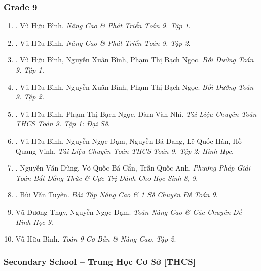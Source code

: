 \documentclass{article}
\begin{document}
\subsubsection{Grade 9}

\begin{enumerate}
	\item \cite{Binh_Toan_9_tap_1}. Vũ Hữu Bình. \textit{Nâng Cao \& Phát Triển Toán 9. Tập 1}.\hfill{\sf[reading]}
	\item \cite{Binh_Toan_9_tap_2}. Vũ Hữu Bình. \textit{Nâng Cao \& Phát Triển Toán 9. Tập 2}.\hfill{\sf[reading]}
	\item \cite{Binh_boi_duong_Toan_9_tap_1}. Vũ Hữu Bình, Nguyễn Xuân Bình, Phạm Thị Bạch Ngọc. \textit{Bồi Dưỡng Toán 9. Tập 1.}\hfill{\sf[finished]}
	\item \cite{Binh_boi_duong_Toan_9_tap_2}. Vũ Hữu Bình, Nguyễn Xuân Bình, Phạm Thị Bạch Ngọc. \textit{Bồi Dưỡng Toán 9. Tập 2.}\hfill{\sf[reading]}
	\item \cite{TLCT_THCS_Toan_9_dai_so}. Vũ Hữu Bình, Phạm Thị Bạch Ngọc, Đàm Văn Nhỉ. \textit{Tài Liệu Chuyên Toán THCS Toán 9. Tập 1: Đại Số}.\hfill{\sf[reading]}
	\item \cite{TLCT_THCS_Toan_9_hinh_hoc}. Vũ Hữu Bình, Nguyễn Ngọc Đạm, Nguyễn Bá Đang, Lê Quốc Hán, Hồ Quang Vinh. \textit{Tài Liệu Chuyên Toán THCS Toán 9. Tập 2: Hình Học}.\hfill{\sf[reading]}
	\item \cite{Dung_Can_Anh_BDT_8_9}. Nguyễn Văn Dũng, Võ Quốc Bá Cẩn, Trần Quốc Anh. \textit{Phương Pháp Giải Toán Bất Đẳng Thức \& Cực Trị Dành Cho Học Sinh 8, 9}.\hfill{\sf[reading]}
	\item \cite{Tuyen_Toan_9_old}. Bùi Văn Tuyên. \textit{Bài Tập Nâng Cao \& 1 Số Chuyên Đề Toán 9}.\hfill{\sf[reading]}
	\item Vũ Dương Thụy, Nguyễn Ngọc Đạm. \textit{Toán Nâng Cao \& Các Chuyên Đề Hình Học 9}.
	\item Vũ Hữu Bình. \textit{Toán 9 Cơ Bản \& Nâng Cao. Tập 2}.
\end{enumerate}

\subsubsection{Secondary School -- Trung Học Cơ Sở [THCS]}
\end{document}
